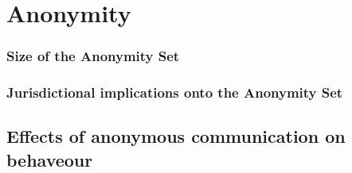 \chapter{Anonymity}

\subsection{Size of the Anonymity Set}


\subsection{Jurisdictional implications onto the Anonymity Set}


\section{Effects of anonymous communication on behaveour}


